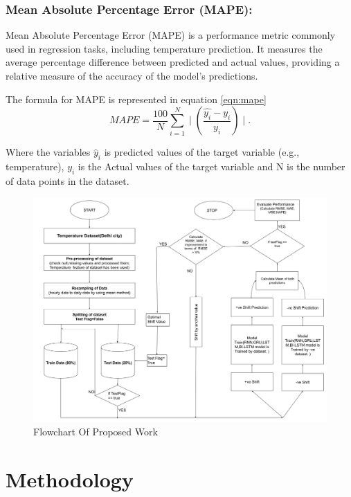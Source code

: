 \documentclass[sn-mathphys,Numbered]{sn-jnl}
\theoremstyle{thmstyleone}
\theoremstyle{thmstyletwo}
\theoremstyle{thmstylethree}
\begin{document}
\subsubsection {Mean Absolute Percentage Error (MAPE):}
Mean Absolute Percentage Error (MAPE) is a performance metric commonly used in regression tasks, including temperature prediction. It measures the average percentage difference between predicted and actual values, providing a relative measure of the accuracy of the model's predictions.

The formula for MAPE is represented in equation \ref{eqn:mape}
\begin{equation}
\label{eqn:mape}
MAPE = \frac{100}{N} \sum_{i=1}^{N} \mid(\frac{\hat{y_{i}} - y_{i}}{y_i})\mid .
\end{equation}


Where the variables $\hat{y}_i$ is predicted values of the target variable (e.g., temperature), $y_i$ is the Actual values of the target variable and N is the number of data points in the dataset.

\begin{figure}[ht!]
    \centering
    \includegraphics[width=1\textwidth, height=0.9\linewidth]{FlowchartOfjournal.png}
    \caption{Flowchart Of Proposed Work}
    \label{fig:Flowchart Of Proposed Work}
\end{figure}
\section{Methodology}
\end{document}
